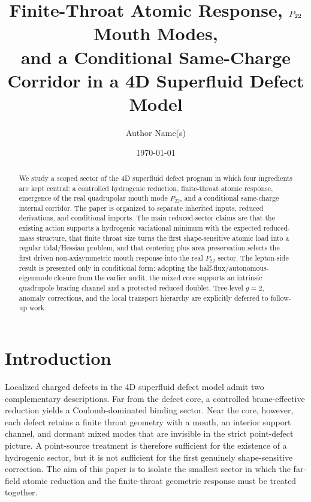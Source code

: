 \documentclass[11pt]{article}
\title{Finite-Throat Atomic Response, \texorpdfstring{$\Ptwotwo$}{P22} Mouth Modes,\\ and a Conditional Same-Charge Corridor in a 4D Superfluid Defect Model}
\author{Author Name(s)}
\date{\today}
\theoremstyle{plain}
\theoremstyle{definition}
\theoremstyle{remark}
\newcommand{\Ptwotwo}{P_{22}}
\begin{document}
\maketitle

\begin{abstract}
We study a scoped sector of the 4D superfluid defect program in which four ingredients are kept central: a controlled hydrogenic reduction, finite-throat atomic response, emergence of the real quadrupolar mouth mode \(\Ptwotwo\), and a conditional same-charge internal corridor. The paper is organized to separate inherited inputs, reduced derivations, and conditional imports. The main reduced-sector claims are that the existing action supports a hydrogenic variational minimum with the expected reduced-mass structure, that finite throat size turns the first shape-sensitive atomic load into a regular tidal/Hessian problem, and that centering plus area preservation selects the first driven non-axisymmetric mouth response into the real \(\Ptwotwo\) sector. The lepton-side result is presented only in conditional form: adopting the half-flux/autonomous-eigenmode closure from the earlier audit, the mixed core supports an intrinsic quadrupole bracing channel and a protected reduced doublet. Tree-level \(g=2\), anomaly corrections, and the local transport hierarchy are explicitly deferred to follow-up work.
\end{abstract}

\section{Introduction}\label{sec:intro}

Localized charged defects in the 4D superfluid defect model admit two complementary descriptions. Far from the defect core, a controlled brane-effective reduction yields a Coulomb-dominated binding sector. Near the core, however, each defect retains a finite throat geometry with a mouth, an interior support channel, and dormant mixed modes that are invisible in the strict point-defect picture. A point-source treatment is therefore sufficient for the existence of a hydrogenic sector, but it is not sufficient for the first genuinely shape-sensitive correction. The aim of this paper is to isolate the smallest sector in which the far-field atomic reduction and the finite-throat geometric response must be treated together.
\end{document}
